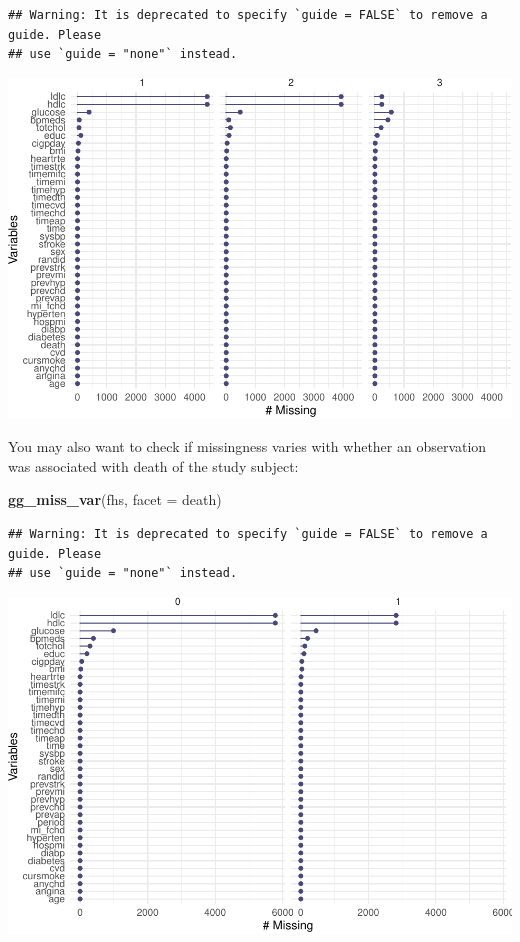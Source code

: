 \documentclass[
]{book}
\newenvironment{Shaded}{\begin{snugshade}}{\end{snugshade}}
\newcommand{\DataTypeTok}[1]{\textcolor[rgb]{0.13,0.29,0.53}{#1}}
\newcommand{\KeywordTok}[1]{\textcolor[rgb]{0.13,0.29,0.53}{\textbf{#1}}}
\newcommand{\NormalTok}[1]{#1}
\begin{document}
\begin{verbatim}
## Warning: It is deprecated to specify `guide = FALSE` to remove a guide. Please
## use `guide = "none"` instead.
\end{verbatim}

\includegraphics{adv_epi_analysis_files/figure-latex/unnamed-chunk-154-1.pdf}

You may also want to check if missingness varies with whether an observation
was associated with death of the study subject:

\begin{Shaded}
\begin{Highlighting}[]
\KeywordTok{gg_miss_var}\NormalTok{(fhs, }\DataTypeTok{facet =}\NormalTok{ death)}
\end{Highlighting}
\end{Shaded}

\begin{verbatim}
## Warning: It is deprecated to specify `guide = FALSE` to remove a guide. Please
## use `guide = "none"` instead.
\end{verbatim}

\includegraphics{adv_epi_analysis_files/figure-latex/unnamed-chunk-155-1.pdf}
\end{document}
